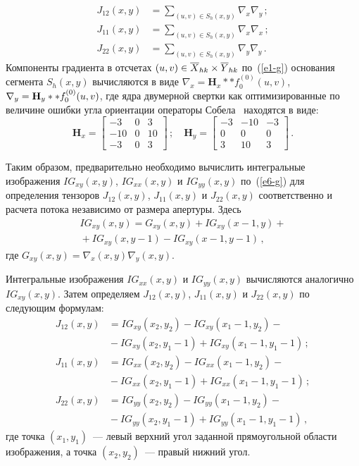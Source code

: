 \begin{multicols}{2}
\noindent
\begin{align*}
J_{12}(x,y)&=\sum\limits_{(u,v)\in S_h(x,y)}\nabla_x \nabla_y\,;\\
J_{11}(x,y)&=\sum\limits_{(u,v)\in S_h(x,y)}\nabla_x\nabla_x\,;\\
J_{22}(x,y) &= 
\sum\limits_{(u,v)\in S_h(x,y)}\nabla_y\nabla_y\,.
\end{align*}
Компоненты градиента в 
отсчетах $(u,v)\in \overline{X}_{hk}\hm\times \overline{Y}_{hk}$ по~(\ref{e1-g}) 
основания сегмента $S_h(x,y)$ вычисляются в виде 
$\nabla_x=\mathbf{H}_x**f_0^{(0)}(u,v)$,  $\nabla_y\hm=\mathbf{H}_y ** 
f_0^{(0)}(u,v)$, где ядра двумерной свертки как оптимизированные по 
величине ошибки угла ориентации операторы Собела~\cite{5-g} находятся в 
виде:
$$
\mathbf{H}_x=\begin{bmatrix}
-3 & 0 & 3\\
-10 & 0 & 10\\
-3 & 0 & 3
\end{bmatrix}\,;\quad 
\mathbf{H}_y=\begin{bmatrix}
-3 & -10 & -3\\
0&0&0\\
3 &10&3
\end{bmatrix}\,.
$$
  
  Таким образом, предварительно необходимо вычислить интегральные 
изображения $IG_{xy}(x,y)$, $IG_{xx}(x,y)$ и $IG_{yy}(x,y)$ по~(\ref{e6-g}) 
для определения тензоров $J_{12}(x,y)$, $J_{11}(x,y)$ и $J_{22}(x,y)$ 
соответственно и расчета потока независимо от размера апертуры. Здесь
  \begin{multline*}
  IG_{xy}(x,y) =G_{xy}(x,y)+IG_{xy}(x-1,y)+{}\\
  {}+IG_{xy}(x,y-1)-IG_{xy}(x-1,y-1)\,,
  \end{multline*}
где $G_{xy}(x,y)=\nabla_x(x,y)\nabla_y(x,y)$.
  
  Интегральные изображения $IG_{xx}(x,y)$ и $IG_{yy}(x,y)$  вычисляются 
аналогично $IG_{xy}(x,y)$. Затем определяем $J_{12}(x,y)$, $J_{11}(x,y)$ и 
$J_{22}(x,y)$ по следующим формулам:
\begin{align*}
J_{12}(x,y) &=IG_{xy}(x_2,y_2)-IG_{xy}(x_1-1,y_2)-{}\\
&{}-IG_{xy}(x_2,y_1-1)+IG_{xy}(x_1-1,y_1-1)\,;\\
J_{11}(x,y) &=IG_{xx}(x_2,y_2)-IG_{xx}(x_1-1,y_2)-{}\\
&{}-IG_{xx}(x_2,y_1-1)+IG_{xx}(x_1-1,y_1-1)\,;\\ 
J_{22}(x,y) &=IG_{yy}(x_2,y_2)-IG_{yy}(x_1-1,y_2)-{}\\
&{}-IG_{yy}(x_2,y_1-1)+IG_{yy}(x_1-1,y_1-1)\,,
\end{align*}
 где точка $(x_1,y_1)$~--- левый верхний угол заданной прямоугольной области 
изображения, а точка $(x_2,y_2)$~--- правый нижний угол.
  

\end{multicols}
